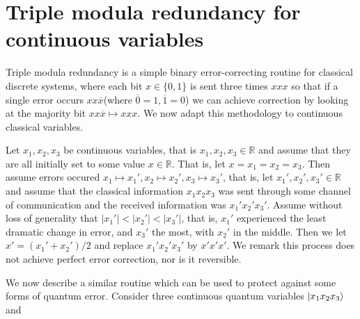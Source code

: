 \documentclass[12pt]{article}
\theoremstyle{plain}
\theoremstyle{definition}
\newcommand{\bb}[1]{\mathbb{#1}}
\begin{document}
\section{Triple modula redundancy for continuous variables}
Triple modula redundancy is a simple binary error-correcting routine for classical discrete systems, where each bit $x \in \{ 0, 1 \}$ is sent three times $xxx$ so that if a single error occurs $xx\overline{x}$(where $\overline{0} = 1, \overline{1} = 0$) we can achieve correction by looking at the majority bit $xx\overline{x} \longmapsto xxx$. We now adapt this methodology to continuous classical variables.

Let $x_1, x_2, x_3$ be continuous variables, that is $x_1, x_2, x_3 \in \bb{R}$ and assume that they are all initially set to some value $x \in \bb{R}$. That is, let $x = x_1 = x_2 = x_3$. Then assume errors occured $x_1 \longmapsto x_1', x_2 \longmapsto x_2', x_3 \longmapsto x_3'$, that is, let $x_1', x_2', x_3' \in \bb{R}$ and assume that the classical information $x_1 x_2 x_3$ was sent through some channel of communication and the received information was $x_1'x_2'x_3'$. Assume without loss of generality that $|x_1'| < |x_2'| < |x_3'|$, that is, $x_1'$ experienced the least dramatic change in error, and $x_3'$ the most, with $x_2'$ in the middle. Then we let $x' = (x_1' + x_2')/2$ and replace $x_1'x_2'x_3'$ by $x'x'x'$. We remark this process does not achieve perfect error correction, nor is it reversible.

We now describe a similar routine which can be used to protect against some forms of quantum error. Consider three continuous quantum variables $\ket{x_1 x_2 x_3}$ and 
\end{document}
